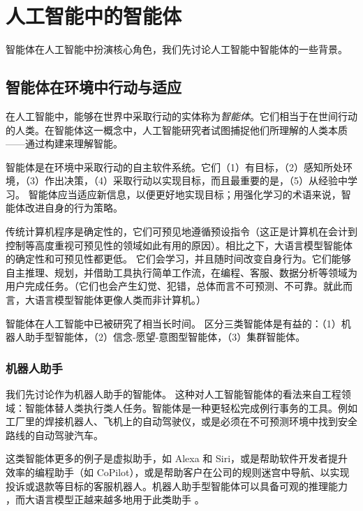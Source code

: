 \section{人工智能中的智能体}
智能体在人工智能中扮演核心角色，我们先讨论人工智能中智能体的一些背景。%

\subsection{智能体在环境中行动与适应}
在人工智能中，能够在世界中采取行动的实体称为{\em 智能体}。它们相当于在世间行动的人类。在智能体这一概念中，人工智能研究者试图捕捉他们所理解的人类本质——通过构建来理解智能。

智能体是在环境中采取行动的自主软件系统。它们（1）有目标，（2）感知所处环境，（3）作出决策，（4）采取行动以实现目标，而且最重要的是，（5）从经验中学习。
智能体应当适应新信息，以便更好地实现目标；用强化学习的术语来说，智能体改进自身的行为策略。

传统计算机程序是确定性的，它们可预见地遵循预设指令（这正是计算机在会计到控制等高度重视可预见性的领域如此有用的原因）。相比之下，大语言模型智能体的确定性和可预见性都更低。%
它们会学习，并且随时间改变自身行为。它们能够自主推理、规划，并借助工具执行简单工作流，在编程、客服、数据分析等领域为用户完成任务。（它们也会产生幻觉、犯错，总体而言不可预测、不可靠。就此而言，大语言模型智能体更像人类而非计算机。）

智能体在人工智能中已被研究了相当长时间。
区分三类智能体是有益的：（1）机器人助手型智能体，（2）信念-愿望-意图型智能体，（3）集群智能体。

\subsubsection{机器人助手}
我们先讨论作为机器人助手的智能体。
这种对人工智能智能体的看法来自工程领域：智能体替人类执行类人任务。智能体是一种更轻松完成例行事务的工具。例如工厂里的焊接机器人、飞机上的自动驾驶仪，或是必须在不可预测环境中找到安全路线的自动驾驶汽车。

这类智能体更多的例子是虚拟助手，如 Alexa 和 Siri，或是帮助软件开发者提升效率的编程助手（如 CoPilot），或是帮助客户在公司的规则迷宫中导航、以实现投诉或退款等目标的客服机器人。机器人助手型智能体可以具备可观的推理能力 \citep{dorri2018multi}，而大语言模型正越来越多地用于此类助手 \citep{plaat2025agentic}。

